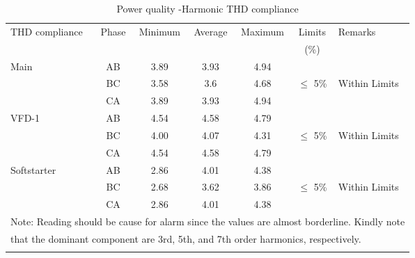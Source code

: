 \begin{table}[!htb]
	\caption{Power quality -Harmonic THD compliance}
	\label{tbl_ch04_elecaudit_powerquality_thdcompliance}
	{\scriptsize
		
		\begin{tabular}{l|c|c|c|c|c|l}
\hline
THD compliance & Phase & Minimum & Average & Maximum & Limits & Remarks \\ 
&  &  &  &  & (\%) &  \\ 
\hline
Main  & AB & 3.89 & 3.93 & 4.94 &  &  \\ 
& BC & 3.58 & 3.6 & 4.68 & $\leq$ 5\% & Within  Limits \\ 
& CA & 3.89 & 3.93 & 4.94 &  &  \\ 
\hline
VFD-1 & AB & 4.54 & 4.58 & 4.79 &  &  \\ 
& BC & 4.00 & 4.07 & 4.31 & $\leq$ 5\% & Within Limits \\ 
& CA & 4.54 & 4.58 & 4.79 &  &  \\ 
\hline
Softstarter & AB & 2.86 & 4.01 & 4.38 &  &  \\ 
& BC & 2.68 & 3.62 & 3.86 & $\leq$ 5\% & Within Limits \\ 
& CA & 2.86 & 4.01 & 4.38 &  &  \\ 
\hline
\multicolumn{7}{l}{Note: Reading should be cause for alarm since the values are almost borderline. Kindly note} \\ 
\multicolumn{7}{l}{that the dominant component are 3rd, 5th, and 7th order harmonics, respectively.} \\ 
\multicolumn{7}{l}{} \\ 
		\end{tabular}
		
		
		
	}%
\end{table}